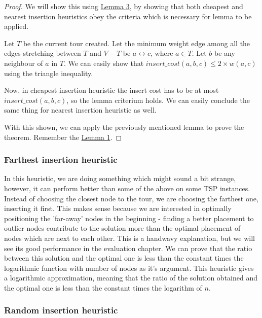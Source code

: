 \documentclass[12pt,twoside,notitlepage]{report}
\begin{document}
\begin{proof}

We will show this using \hyperref[insertlemma]{Lemma 3}, by showing that both cheapest and nearest insertion heuristics obey the criteria which is necessary for lemma to be applied.

\smallskip

Let $T$ be the current tour created. Let the minimum weight edge among all the edges stretching between $T$ and $V - T$ be $a \leftrightarrow c$, where $a \in T$. Let $b$ be any neighbour of $a$ in $T$. We can easily show that $insert\_cost(a, b, c) \leq 2 \times w(a, c)$ using the triangle inequality.

Now, in cheapest insertion heuristic the insert cost has to be at most $insert\_cost(a, b, c)$, so the lemma criterium holds. We can easily conclude the same thing for nearest insertion heuristic as well.

With this shown, we can apply the previously mentioned lemma to prove the theorem. Remember the \hyperref[mstlemma]{Lemma 1}.

\end{proof}

\subsubsection{Farthest insertion heuristic}

In this heuristic, we are doing something which might sound a bit strange, however, it can perform better than some of the above on some TSP instances. Instead of choosing the closest node to the tour, we are choosing the farthest one, inserting it first. This makes sense because we are interested in optimally positioning the 'far-away' nodes in the beginning - finding a better placement to outlier nodes contribute to the solution more than the optimal placement of nodes which are next to each other. This is a handwavy explanation, but we will see its good performance in the evaluation chapter. We can prove that the ratio between this solution and the optimal one is less than the constant times the logarithmic function with number of nodes as it's argument. This heuristic gives a logarithmic approximation, meaning that the ratio of the solution obtained and the optimal one is less than the constant times the logarithm of $n$.

\subsubsection{Random insertion heuristic}
\end{document}
